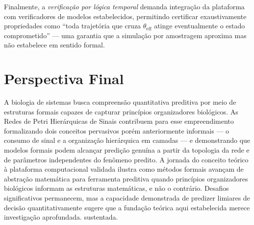 Finalmente, a \emph{verificação por lógica temporal} demanda integração da
plataforma com verificadores de modelos estabelecidos, permitindo certificar
exaustivamente propriedades como ``toda trajetória que cruza
$\theta_{\text{eff}}$ atinge eventualmente o estado comprometido'' --- uma
garantia que a simulação por amostragem aproxima mas não estabelece em
sentido formal.

\section{Perspectiva Final}
\label{sec:perspectiva-final}

A biologia de sistemas busca compreensão quantitativa preditiva por meio
de estruturas formais capazes de capturar princípios organizadores
biológicos. As Redes de Petri Hierárquicas de Sinais contribuem para esse
empreendimento formalizando dois conceitos pervasivos porém anteriormente
informais --- o consumo de sinal e a organização hierárquica em camadas --- e
demonstrando que modelos formais podem alcançar predição genuína a partir da
topologia da rede e de parâmetros independentes do fenômeno predito. A
jornada do conceito teórico à plataforma computacional validada ilustra
como métodos formais avançam de abstração matemática para ferramenta
preditiva quando princípios organizadores biológicos informam as estruturas
matemáticas, e não o contrário. Desafios significativos permanecem, mas a
capacidade demonstrada de predizer limiares de decisão quantitativamente
sugere que a fundação teórica aqui estabelecida merece investigação
aprofundada.
sustentada.